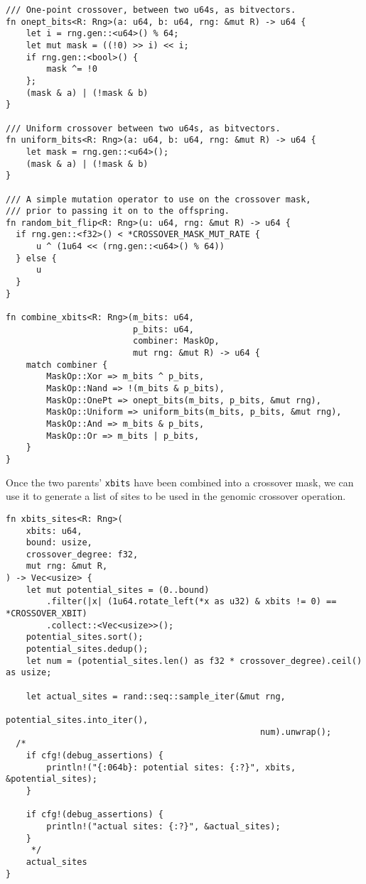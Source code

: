 \documentclass[11pt]{article}
\begin{document}
\lstset{language=rust,label=org9c9d6ed,caption= ,captionpos=b,numbers=none}
\begin{lstlisting}
/// One-point crossover, between two u64s, as bitvectors.
fn onept_bits<R: Rng>(a: u64, b: u64, rng: &mut R) -> u64 {
    let i = rng.gen::<u64>() % 64;
    let mut mask = ((!0) >> i) << i;
    if rng.gen::<bool>() {
        mask ^= !0
    };
    (mask & a) | (!mask & b)
}

/// Uniform crossover between two u64s, as bitvectors.
fn uniform_bits<R: Rng>(a: u64, b: u64, rng: &mut R) -> u64 {
    let mask = rng.gen::<u64>();
    (mask & a) | (!mask & b)
}

/// A simple mutation operator to use on the crossover mask,
/// prior to passing it on to the offspring.
fn random_bit_flip<R: Rng>(u: u64, rng: &mut R) -> u64 {
  if rng.gen::<f32>() < *CROSSOVER_MASK_MUT_RATE {
      u ^ (1u64 << (rng.gen::<u64>() % 64)) 
  } else {
      u
  }
}

fn combine_xbits<R: Rng>(m_bits: u64,
                         p_bits: u64,
                         combiner: MaskOp,
                         mut rng: &mut R) -> u64 {
    match combiner {
        MaskOp::Xor => m_bits ^ p_bits,
        MaskOp::Nand => !(m_bits & p_bits),
        MaskOp::OnePt => onept_bits(m_bits, p_bits, &mut rng),
        MaskOp::Uniform => uniform_bits(m_bits, p_bits, &mut rng),
        MaskOp::And => m_bits & p_bits,
        MaskOp::Or => m_bits | p_bits,
    }
}
\end{lstlisting}

Once the two parents' \texttt{xbits} have been combined into a crossover mask, we
can use it to generate a list of sites to be used in the genomic crossover
operation. 

\lstset{language=rust,label=orgc1433ce,caption= ,captionpos=b,numbers=none}
\begin{lstlisting}
fn xbits_sites<R: Rng>(
    xbits: u64,
    bound: usize,
    crossover_degree: f32,
    mut rng: &mut R,
) -> Vec<usize> {
    let mut potential_sites = (0..bound)
        .filter(|x| (1u64.rotate_left(*x as u32) & xbits != 0) == *CROSSOVER_XBIT)
        .collect::<Vec<usize>>();
    potential_sites.sort();
    potential_sites.dedup();
    let num = (potential_sites.len() as f32 * crossover_degree).ceil() as usize;

    let actual_sites = rand::seq::sample_iter(&mut rng,
                                                  potential_sites.into_iter(), 
                                                  num).unwrap();
  /*
    if cfg!(debug_assertions) {
        println!("{:064b}: potential sites: {:?}", xbits, &potential_sites);
    }

    if cfg!(debug_assertions) {
        println!("actual sites: {:?}", &actual_sites);
    }
     */
    actual_sites
}
\end{lstlisting}
\end{document}
